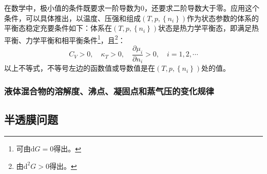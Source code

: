 \documentclass[main.tex]{subfiles}
\begin{document}
在数学中，极小值的条件既要求一阶导数为0，还要求二阶导数大于零。应用这个条件，可以具体推出，以温度、压强和组成$\left(T,p,\left\{n_i\right\}\right)$作为状态参数的体系的平衡态稳定充要条件如下：体系在$\left(T,p,\left\{n_i\right\}\right)$状态是热力学平衡态，即满足热平衡、力学平衡和相平衡条件\footnote{可由$\mathrm{d}G=0$得出。}，且\footnote{由$\mathrm{d}^2G>0$得出。}：
\[C_V>0,\quad \kappa_T>0,\quad \frac{\partial \mu_i}{\partial n_i}>0,\quad i=1,2,\cdots\]
以上不等式，不等号左边的函数值或导数值是在$\left(T,p,\left\{n_i\right\}\right)$处的值。

\subsubsection{液体混合物的溶解度、沸点、凝固点和蒸气压的变化规律}

\subsection{半透膜问题}
\end{document}
